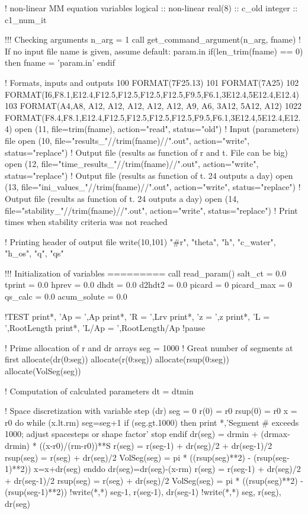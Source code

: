 ! non-linear MM equation variables
logical :: non-linear
real(8) :: c_old
integer :: c1_num_it


!!! Checking arguments
n_arg = 1
call get_command_argument(n_arg, fname)
! If no input file name is given, assume default: param.in
if(len_trim(fname) == 0) then
  fname = 'param.in'
endif

! Formats, inputs and outputs
100  FORMAT(7F25.13)
101  FORMAT(7A25)
102  FORMAT(I6,F8.1,E12.4,F12.5,F12.5,F12.5,F12.5,F9.5,F6.1,3E12.4,5E12.4,E12.4)
103  FORMAT(A4,A8,  A12,  A12,  A12,  A12,  A12,  A9,  A6,  3A12,  5A12,  A12)
1022 FORMAT(F8.4,F8.1,E12.4,F12.5,F12.5,F12.5,F12.5,F9.5,F6.1,3E12.4,5E12.4,E12.4)
open (11, file=trim(fname), action="read", status="old")			! Input (parameters) file
open (10, file="results_"//trim(fname)//".out", action="write", status="replace")	! Output file (results as function of r and t. File can be big)
open (12, file="time_results_"//trim(fname)//".out", action="write", status="replace")	! Output file (results as function of t. 24 outputs a day)
open (13, file="ini_values_"//trim(fname)//".out", action="write", status="replace")	! Output file (results as function of t. 24 outputs a day)
open (14, file="stability_"//trim(fname)//".out", action="write", status="replace")	! Print times when stability criteria was not reached

! Printing header of output file
write(10,101) "#r", "theta", "h", "c_water", "h_os", "q", "qs"


!!! Initialization of variables =========
call read_param()
salt_ct     = 0.0
tprint      = 0.0
hprev       = 0.0
dhdt        = 0.0
d2hdt2      = 0.0
picard      = 0
picard_max  = 0
qs_calc     = 0.0
acum_solute = 0.0

!TEST
print*, 'Ap = ',Ap
print*, 'R = ',Lrv
print*, 'z = ',z
print*, 'L = ',RootLength
print*, 'L/Ap = ',RootLength/Ap
!pause

! Prime allocation of r and dr arrays
seg = 1000	! Great number of segments at first
allocate(dr(0:seg))
allocate(r(0:seg))
allocate(rsup(0:seg))
allocate(VolSeg(seg))

! Computation of calculated parameters
dt = dtmin

! Space discretization with variable step (dr)
seg = 0
r(0) = r0
rsup(0) = r0
x = r0
do while (x.lt.rm)
  seg=seg+1
  if (seg.gt.1000) then
     print *,'Segment # exceeds 1000; adjust spacesteps or shape factor'
     stop
  endif
  dr(seg) = drmin + (drmax-drmin) * ((x-r0)/(rm-r0))**S
  r(seg) = r(seg-1) + dr(seg)/2 + dr(seg-1)/2
  rsup(seg) = r(seg) + dr(seg)/2
  VolSeg(seg) = pi * ((rsup(seg)**2) - (rsup(seg-1)**2))
  x=x+dr(seg)
enddo
dr(seg)=dr(seg)-(x-rm)
r(seg) = r(seg-1) + dr(seg)/2 + dr(seg-1)/2
rsup(seg) = r(seg) + dr(seg)/2
VolSeg(seg) = pi * ((rsup(seg)**2) - (rsup(seg-1)**2))
!write(*,*) seg-1, r(seg-1), dr(seg-1)
!write(*,*) seg, r(seg), dr(seg)

